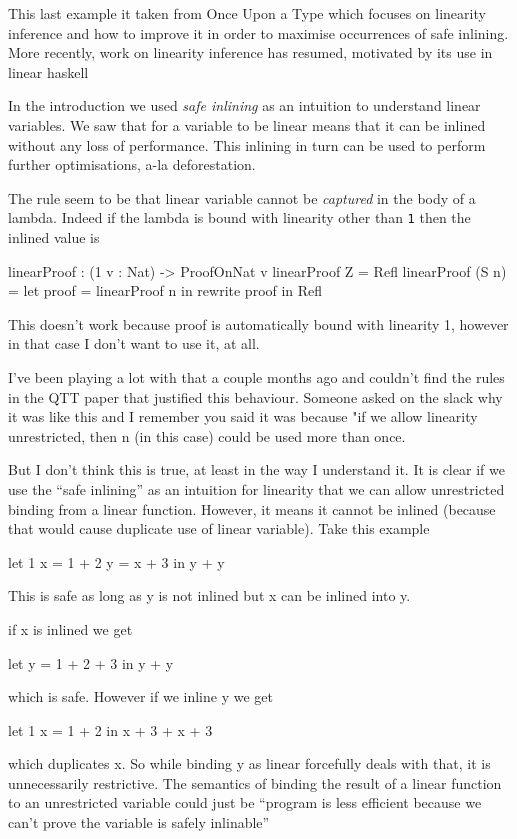 \documentclass[
]{article}
\begin{document}
This last example it taken from Once Upon a Type which focuses on
linearity inference and how to improve it in order to maximise
occurrences of safe inlining. More recently, work on linearity
inference\cite{linear_inference} has resumed, motivated by its use in
linear haskell \cite{linear_haskell}

In the introduction we used \emph{safe inlining} as an intuition to
understand linear variables. We saw that for a variable to be linear
means that it can be inlined without any loss of performance. This
inlining in turn can be used to perform further optimisations, a-la
deforestation.

The rule seem to be that linear variable cannot be \emph{captured} in
the body of a lambda. Indeed if the lambda is bound with linearity other
than \texttt{1} then the inlined value is

linearProof : (1 v : Nat) -\textgreater{} ProofOnNat v linearProof Z =
Refl linearProof (S n) = let proof = linearProof n in rewrite proof in
Refl

This doesn't work because proof is automatically bound with linearity 1,
however in that case I don't want to use it, at all.

I've been playing a lot with that a couple months ago and couldn't find
the rules in the QTT paper that justified this behaviour. Someone asked
on the slack why it was like this and I remember you said it was because
"if we allow linearity unrestricted, then n (in this case) could be used
more than once.

But I don't think this is true, at least in the way I understand it. It
is clear if we use the ``safe inlining'' as an intuition for linearity
that we can allow unrestricted binding from a linear function. However,
it means it cannot be inlined (because that would cause duplicate use of
linear variable). Take this example

let 1 x = 1 + 2 y = x + 3 in y + y

This is safe as long as y is not inlined but x can be inlined into y.

if x is inlined we get

let y = 1 + 2 + 3 in y + y

which is safe. However if we inline y we get

let 1 x = 1 + 2 in x + 3 + x + 3

which duplicates x. So while binding y as linear forcefully deals with
that, it is unnecessarily restrictive. The semantics of binding the
result of a linear function to an unrestricted variable could just be
``program is less efficient because we can't prove the variable is
safely inlinable''
\end{document}
